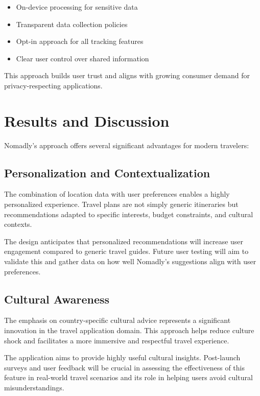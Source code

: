 \documentclass[11pt, a4paper]{article}
\begin{document}
\begin{itemize}
    \item On-device processing for sensitive data
    \item Transparent data collection policies
    \item Opt-in approach for all tracking features
    \item Clear user control over shared information
\end{itemize}

This approach builds user trust and aligns with growing consumer demand for privacy-respecting applications.

\section{Results and Discussion}

Nomadly's approach offers several significant advantages for modern travelers:

\subsection{Personalization and Contextualization}

The combination of location data with user preferences enables a highly personalized experience. Travel plans are not simply generic itineraries but recommendations adapted to specific interests, budget constraints, and cultural contexts.

The design anticipates that personalized recommendations will increase user engagement compared to generic travel guides. Future user testing will aim to validate this and gather data on how well Nomadly's suggestions align with user preferences.

\subsection{Cultural Awareness}

The emphasis on country-specific cultural advice represents a significant innovation in the travel application domain. This approach helps reduce culture shock and facilitates a more immersive and respectful travel experience.

The application aims to provide highly useful cultural insights. Post-launch surveys and user feedback will be crucial in assessing the effectiveness of this feature in real-world travel scenarios and its role in helping users avoid cultural misunderstandings.
\end{document}
